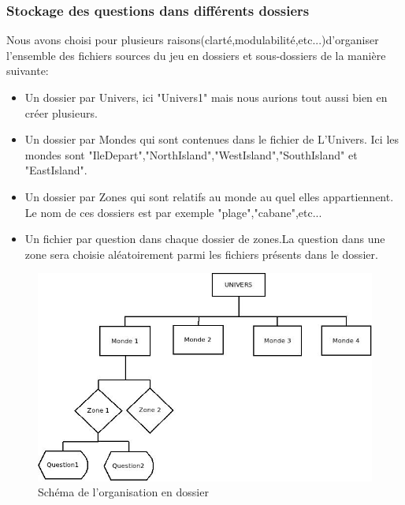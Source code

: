 \newpage
\subsubsection{Stockage des questions dans différents dossiers}
Nous avons choisi pour plusieurs raisons(clarté,modulabilité,etc...)d'organiser l'ensemble des fichiers sources du jeu en dossiers et sous-dossiers de la manière suivante:\begin{itemize}
			\item Un dossier par Univers, ici "Univers1" mais nous aurions tout aussi bien en créer plusieurs.
			\item Un dossier par Mondes qui sont contenues dans le fichier de L'Univers. Ici les mondes sont "IleDepart","NorthIsland","WestIsland","SouthIsland" et "EastIsland".
			\item Un dossier par Zones qui sont relatifs au monde au quel elles appartiennent. Le nom de ces dossiers est par exemple "plage","cabane",etc...
			\item Un fichier par question dans chaque dossier de zones.La question dans une zone sera choisie aléatoirement parmi les fichiers présents dans le dossier.   
	     \end{itemize}
\begin{figure}[h]
 \includegraphics[scale=0.8]{./figures/hier.jpeg}
	\caption{Schéma de l'organisation en dossier }
\end{figure}